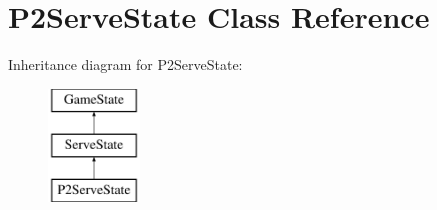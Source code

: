 \hypertarget{class_p2_serve_state}{}\section{P2\+Serve\+State Class Reference}
\label{class_p2_serve_state}
Inheritance diagram for P2\+Serve\+State\+:\begin{figure}[H]
\begin{center}
\leavevmode
\includegraphics[height=3.000000cm]{class_p2_serve_state}
\end{center}
\end{figure}
